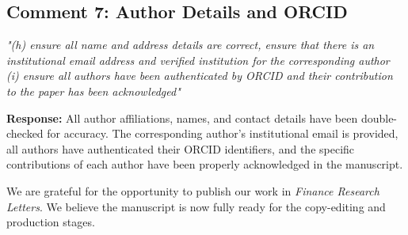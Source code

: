 \documentclass[12pt]{article}
\begin{document}
\subsection*{Comment 7: Author Details and ORCID}
\textit{"(h) ensure all name and address details are correct, ensure that there is an institutional email address and verified institution for the corresponding author (i) ensure all authors have been authenticated by ORCID and their contribution to the paper has been acknowledged"}

\begin{highlightbox}
\textbf{Response:} All author affiliations, names, and contact details have been double-checked for accuracy. The corresponding author's institutional email is provided, all authors have authenticated their ORCID identifiers, and the specific contributions of each author have been properly acknowledged in the manuscript.
\end{highlightbox}

\vspace{0.5cm}
\noindent We are grateful for the opportunity to publish our work in \textit{Finance Research Letters}. We believe the manuscript is now fully ready for the copy-editing and production stages.
\end{document}
